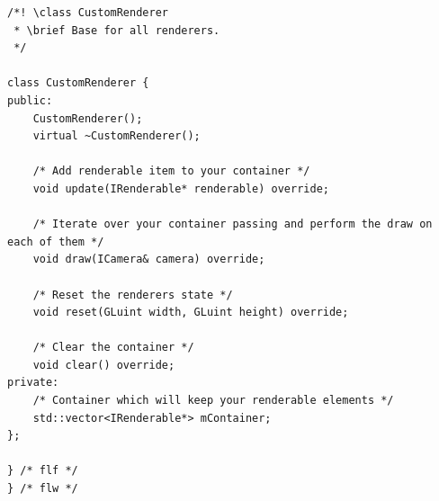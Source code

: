 \documentclass{article}
\begin{document}
\begin{lstlisting}
/*! \class CustomRenderer
 * \brief Base for all renderers.
 */

class CustomRenderer {
public:
	CustomRenderer();
	virtual ~CustomRenderer();

	/* Add renderable item to your container */
	void update(IRenderable* renderable) override;
	
	/* Iterate over your container passing and perform the draw on each of them */
	void draw(ICamera& camera) override;
	
	/* Reset the renderers state */
	void reset(GLuint width, GLuint height) override;
	
	/* Clear the container */
	void clear() override;
private:
	/* Container which will keep your renderable elements */
	std::vector<IRenderable*> mContainer;
};

} /* flf */
} /* flw */

\end{lstlisting}

\newpage



\end{document}
